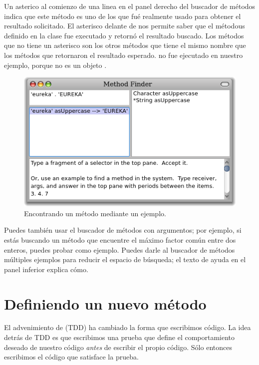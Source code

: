 \documentclass[a4paper,10pt,twoside]{book}
\begin{document}
Un asterico al comienzo de una linea en el panel derecho del buscador de m\'etodos indica que este m\'etodo es uno de los que fu\'e realmente usado para obtener el resultado solicitado. 
El asterisco delante de  nos permite saber que el m\'etodous  definido en la clase  fue executado y retorn\'o el resultado buscado. Los m\'etodos que no tiene un asterisco son los otros m\'etodos que tiene el mismo nombre que los m\'etodos que retornaron el resultado esperado.  no fue ejecutado en nuestro ejemplo, porque  no es un objeto .

\begin{figure}[hbt]
\centerline {\includegraphics[width=\textwidth]{MethodFinder-example1}}
\caption{Encontrando un m\'etodo mediante un ejemplo.
}
\end{figure}

Puedes tambi\'en usar el buscador de m\'etodos con argumentos; por ejemplo, si est\'as buscando un m\'etodo que encuentre el m\'aximo factor com\'un entre dos enteros, puedes probar  como ejemplo. Puedes darle al buscador de m\'etodos m\'ultiples ejemplos para reducir el espacio de b\'usqueda; el texto de ayuda en el panel inferior explica c\'omo.

\section{Definiendo un nuevo m\'etodo}

El advenimiento de \cite{Beck03a} (TDD) ha cambiado la forma que escribimos c\'odigo.
La idea detr\'as de TDD es que escribimos una prueba que define el comportamiento deseado de nuestro c\'odigo \emph{antes} de escribir el propio c\'odigo.
S\'olo entonces escribimos el c\'odigo que satisface la prueba.
\end{document}
